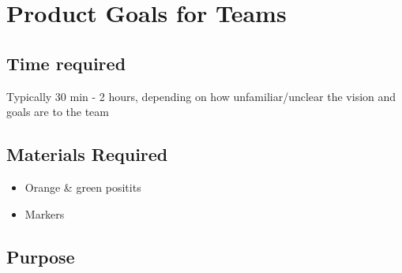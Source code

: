 \documentclass[a4paper,,tablecaptionabove]{scrartcl}
\date{}
\title{}
\author{}
\providecommand{\tightlist}{%
  \setlength{\itemsep}{0pt}\setlength{\parskip}{0pt}}
\renewcommand{\headrulewidth}{0.4pt}
\renewcommand{\footrulewidth}{0.4pt}
\begin{document}



\fancyfoot[LE,RO]{\thepage}


\renewcommand{\headrulewidth}{0pt}
\renewcommand{\footrulewidth}{0.4pt}

\pagestyle{fancy}
  \rfoot{\thepage}




\hypertarget{product-goals-for-teams}{%
\section*{Product Goals for Teams}\label{product-goals-for-teams}}

\hypertarget{time-required}{%
\subsection*{Time required}\label{time-required}}

Typically 30 min - 2 hours, depending on how unfamiliar/unclear the
vision and goals are to the team

\hypertarget{materials-required}{%
\subsection*{Materials Required}\label{materials-required}}

\begin{itemize}
\tightlist
\item
  Orange \& green positits
\item
  Markers
\end{itemize}

\hypertarget{purpose}{%
\subsection*{Purpose}\label{purpose}}
\end{document}
